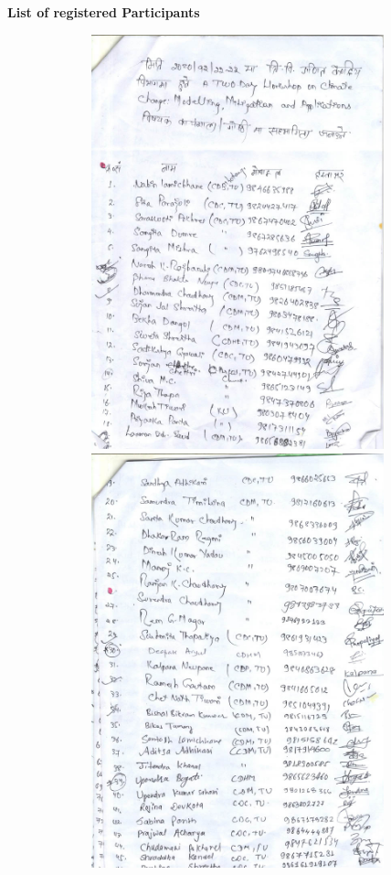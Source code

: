 \documentclass[a4paper,12pt]{report}
\begin{document}
{\bfseries \large List of registered Participants}
\begin{figure}[h!]
  \centering
  \includegraphics[width=12cm, height=12cm]{1.jpg}
  \includegraphics[width=12cm, height=12cm]{2.jpg}
\end{figure}
\end{document}
